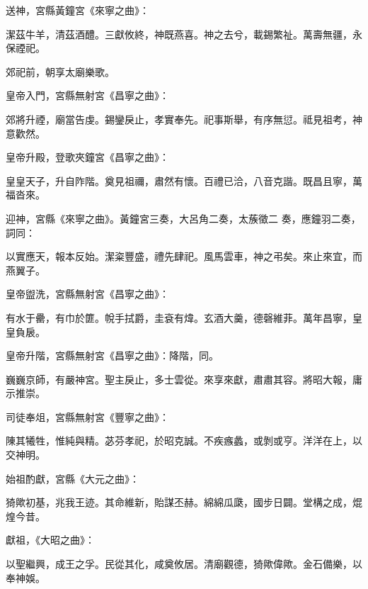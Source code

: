 \begin{pinyinscope}
 送神，宮縣黃鐘宮《來寧之曲》：



 潔茲牛羊，清茲酒醴。三獻攸終，神既燕喜。神之去兮，載錫繁祉。萬壽無疆，永保禋祀。



 郊祀前，朝享太廟樂歌。



 皇帝入門，宮縣無射宮《昌寧之曲》：



 郊將升禋，廟當告虔。錫鑾戾止，孝實奉先。祀事斯舉，有序無愆。祗見祖考，神意歡然。



 皇帝升殿，登歌夾鐘宮《昌寧之曲》：



 皇皇天子，升自阼階。奠見祖禰，肅然有懷。百禮已洽，八音克諧。既昌且寧，萬福沓來。



 迎神，宮縣《來寧之曲》。黃鐘宮三奏，大呂角二奏，太蔟徵二
 奏，應鐘羽二奏，詞同：



 以實應天，報本反始。潔粢豐盛，禮先肆祀。風馬雲車，神之弔矣。來止來宜，而燕翼子。



 皇帝盥洗，宮縣無射宮《昌寧之曲》：



 有水于罍，有巾於篚。帨手拭爵，圭袞有煒。玄酒大羹，德磬維菲。萬年昌寧，皇皇負扆。



 皇帝升階，宮縣無射宮《昌寧之曲》：降階，同。



 巍巍京師，有嚴神宮。聖主戾止，多士雲從。來享來獻，肅肅其容。將昭大報，庸示推崇。



 司徒奉俎，宮縣無射宮《豐寧之曲》：



 陳其犧牲，惟純與精。苾芬孝祀，於昭克誠。不疾瘯蠡，或剝或亨。洋洋在上，以交神明。



 始祖酌獻，宮縣《大元之曲》：



 猗歟初基，兆我王迹。其命維新，貽謀丕赫。綿綿瓜瓞，國步日闢。堂構之成，焜煌今昔。



 獻祖，《大昭之曲》：



 以聖繼興，成王之孚。民從其化，咸奠攸居。清廟觀德，猗歟偉歟。金石備樂，以奉神娛。




\end{pinyinscope}
